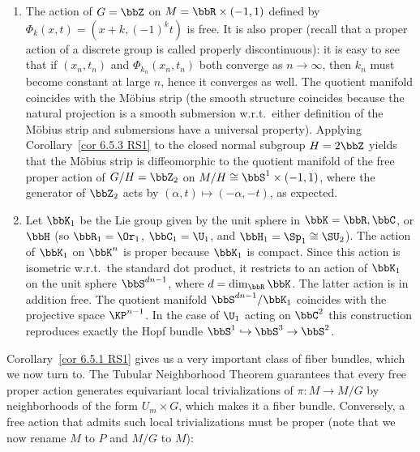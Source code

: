 \begin{example}[{{\cite[Example~6.5.4]{RS1}}}]
    \begin{enumerate}
        \item The action of $G=\bbZ$ on $M=\bbR\times (-1,1)$ defined by $\Phi_k(x,t)=(x+k,(-1)^kt)$ is free. It is also proper (recall that a proper action of a discrete group is called properly discontinuous): it is easy to see that if $(x_n,t_n)$ and $\Phi_{k_n}(x_n,t_n)$ both converge as $n\to \infty$, then $k_n$ must become constant at large $n$, hence it converges as well. The quotient manifold coincides with the M\"obius strip (the smooth structure coincides because the natural projection is a smooth submersion w.r.t.\ either definition of the M\"obius strip and submersions have a universal property). Applying Corollary~\ref{cor 6.5.3 RS1} to the closed normal subgroup $H=2\bbZ$ yields that the M\"obius strip is diffeomorphic to the quotient manifold of the free proper action of $G\slash H=\bbZ_2$ on $M\slash H\cong \bbS^1\times (-1,1)$, where the generator of $\bbZ_2$ acts by $(\alpha,t)\mapsto (-\alpha,-t)$, as expected.
        \item Let $\bbK_1$ be the Lie group given by the unit sphere in $\bbK=\bbR,\bbC$, or $\bbH$ (so $\bbR_1=\Or_1$, $\bbC_1=\U_1$, and $\bbH_1=\Sp_1\cong \SU_2$). The action of $\bbK_1$ on $\bbK^n$ is proper because $\bbK_1$ is compact. Since this action is isometric w.r.t.\ the standard dot product, it restricts to an action of $\bbK_1$ on the unit sphere $\bbS^{dn-1}$, where $d=\dim_\bbR\bbK$. The latter action is in addition free. The quotient manifold $\bbS^{dn-1}\slash\bbK_1$ coincides with the projective space $\KP^{n-1}$. In the case of $\U_1$ acting on $\bbC^2$ this construction reproduces exactly the Hopf bundle  $\bbS^1\hookrightarrow \bbS^3\to \bbS^2$.
    \end{enumerate}
\end{example}


Corollary~\ref{cor 6.5.1 RS1} gives us a very important class of fiber bundles, which we now turn to. The Tubular Neighborhood Theorem guarantees that every free proper action generates equivariant local trivializations of $\pi:M\to M\slash G$ by neighborhoods of the form $U_m\times G$, which makes it a fiber bundle. Conversely, a free action that admits such local trivializations must be proper (note that we now rename $M$ to $P$ and $M\slash G$ to $M$):

